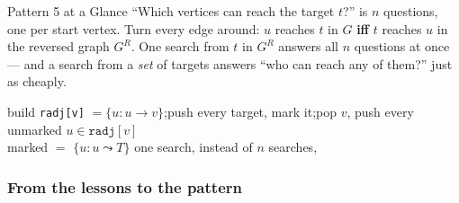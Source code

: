 \begin{patternbox}{Pattern 5 at a Glance}
``Which vertices can reach the target $t$?'' is $n$ questions, one per start vertex. Turn every edge around: $u$ reaches $t$ in $G$ \textbf{iff} $t$ reaches $u$ in the reversed graph $G^R$. One search from $t$ in $G^R$ answers all $n$ questions at once --- and a search from a \emph{set} of targets answers ``who can reach any of them?'' just as cheaply.

\begin{center}
\end{center}
\begin{recurrencebox}
\centering\small
build \texttt{radj[v]} $= \{u : u \to v\}$\quad;\quad push every target, mark it\quad;\quad pop $v$, push every unmarked $u \in \texttt{radj}[v]$\\[3pt]
marked $=$ $\{u : u \leadsto T\}$ \qquad one search, \VE{} instead of $n$ searches, 
\end{recurrencebox}
\end{patternbox}

\subsubsection*{From the lessons to the pattern}

